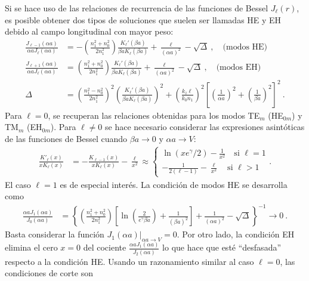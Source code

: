 Si se hace uso de las relaciones de recurrencia de las funciones de Bessel $J_\ell(r)$,  es posible obtener dos tipos de soluciones que suelen ser llamadas HE y EH debido al campo longitudinal con mayor peso:
\begin{align}
		\frac{J_{\ell-1}(\alpha a)}{\alpha a J_\ell(\alpha a)} &= -\left(\frac{n_1^2+n_0^2}{2n_1^2}\right) \frac{K_\ell'(\beta a)}{\beta a K_\ell(\beta a)}+\frac{\ell}{(\alpha a)^2}-\sqrt{\Delta} \ , \quad \text{(modos HE)}
		\label{eqn:HE}
	\\
		\frac{J_{\ell+1}(\alpha a)}{\alpha a J_\ell(\alpha a)} &= \left(\frac{n_1^2+n_0^2}{2n_1^2}\right) \frac{K_\ell'(\beta a)}{\beta a K_\ell(\beta a)}+\frac{\ell}{(\alpha a)^2}-\sqrt{\Delta} \ , \quad \text{(modos EH)}
		\label{eqn:EH}
		\\
		\Delta &= \left(\frac{n_1^2-n_0^2}{2n_1^2}\right)^2\left(\frac{K_\ell'(\beta a)}{\beta a K_\ell(\beta a)}\right)^2+ \left( \frac{ k_z \ell}{ k_0 n_1} \right)^2\left[ \left(\frac{1}{\alpha a}\right)^2 + \left(\frac{1}{\beta a}\right)^2 \right]^2 \ . \nonumber
\end{align}
Para $\ell = 0$, se recuperan las relaciones obtenidas para los modos  TE$_m$ (HE$_{0m}$) y TM$_m$ (EH$_{0m}$). Para $\ell \neq 0$ se hace necesario considerar las expresiones asintóticas de las funciones de Bessel cuando $\beta a \to 0$ y $\alpha a \to V$:
\begin{align*}
	\frac{K'_\ell (x)}{xK_\ell (x)} &= -\frac{K_{\ell-1} (x)}{xK_\ell (x)}-\frac{\ell}{x^2}\approx \left\{\begin{matrix}
	\ln(xe^\gamma/2)-\frac{1}{x^2} \quad\text{si }\ell = 1
	\\
	-\frac{
	1}{2(\ell-1)}-\frac{\ell}{x^2}\quad \text{si }\ell > 1
	\end{matrix}\right. .
\end{align*}
El caso $\ell=1$ es de especial interés. La condición de modos HE se desarrolla como
\begin{align*}
	\frac{\alpha a J_1(\alpha a)}{J_0(\alpha a)} &= \left\{\left(\frac{n_1^2+n_0^2}{2n_1^2}\right) \left[ \ln\left(\frac{2}{e^\gamma \beta a}\right)+\frac{1}{(\beta a)^2} \right]+\frac{1}{(\alpha a)^2}-\sqrt{\Delta}\right\}^{-1} \to 0 \ .
\end{align*}
Basta considerar la función $J_1(\alpha a)|_{\alpha a \to V} = 0$. Por otro lado, la condición EH elimina el cero $x=0$ del cociente $\frac{\alpha aJ_1(\alpha a)}{J_2(\alpha a)}$ lo que hace que esté ``desfasada'' respecto a la condición HE. Usando un razonamiento similar al caso $\ell =0$, las condiciones de corte son
